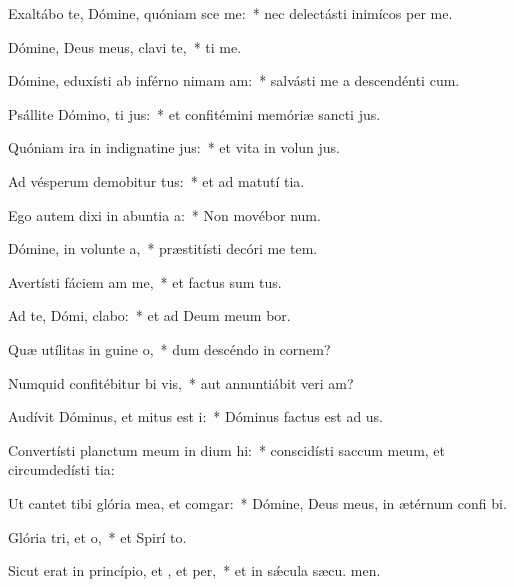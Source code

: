 \item Exaltábo te, Dómine, quóniam sce me:~* nec delectásti inimícos  per me.
\item Dómine, Deus meus, clavi  te,~*  ti me.
\item Dómine, eduxísti ab inférno nimam am:~* salvásti me a descendénti  cum.
\item Psállite Dómino, ti jus:~* et confitémini memóriæ sancti jus.
\item Quóniam ira in indignatine jus:~* et vita in volun jus.
\item Ad vésperum demobitur tus:~* et ad matutí tia.
\item Ego autem dixi in abuntia a:~* Non movébor  num.
\item Dómine, in volunte a,~* præstitísti decóri me tem.
\item Avertísti fáciem am  me,~* et factus sum tus.
\item Ad te, Dómi, clabo:~* et ad Deum meum bor.
\item Quæ utílitas in guine o,~* dum descéndo in cornem?
\item Numquid confitébitur bi vis,~* aut annuntiábit veri am?
\item Audívit Dóminus, et mitus est i:~* Dóminus factus est ad us.
\item Convertísti planctum meum in dium hi:~* conscidísti saccum meum, et circumdedísti  tia:
\item Ut cantet tibi glória mea, et  comgar:~* Dómine, Deus meus, in ætérnum confi bi.
\item Glória tri, et o,~* et Spirí to.
\item Sicut erat in princípio, et , et per,~* et in sǽcula sæcu. men.
